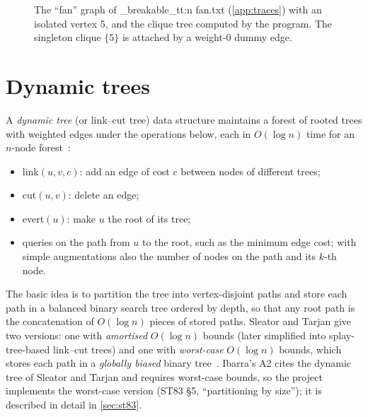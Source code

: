 \documentclass[11pt,a4paper,oneside]{report}
\theoremstyle{plain}
\theoremstyle{definition}
\theoremstyle{remark}
\newcommand{\op}[1]{\textsf{#1}}
\DeclareRobustCommand{\file}[1]{\mtp_breakable_tt:n {#1}}
\begin{document}
\begin{figure}[ht]
\centering
{}
\caption[A clique tree with a dummy edge]{The ``fan'' graph of \file{fan.txt} (\cref{app:traces}) with an isolated vertex 5,
and the clique tree computed by the program. The singleton clique \(\{5\}\) is attached by a
weight-0 dummy edge.}
\label{fig:dummy}
\end{figure}

\section{Dynamic trees}\label{sec:dynamic-trees-background}
A \emph{dynamic tree} (or link--cut tree) data structure maintains a forest of rooted trees
with weighted edges under the operations below, each in \(O(\log n)\) time for an \(n\)-node
forest~\cite{sleator1983}:
\begin{itemize}
\item \op{link}\((u,v,c)\): add an edge of cost \(c\) between nodes of different trees;
\item \op{cut}\((u,v)\): delete an edge;
\item \op{evert}\((u)\): make \(u\) the root of its tree;
\item queries on the path from \(u\) to the root, such as the minimum edge cost; with simple
  augmentations also the number of nodes on the path and its \(k\)-th node.
\end{itemize}
The basic idea is to partition the tree into vertex-disjoint paths and store each path in a
balanced binary search tree ordered by depth, so that any root path is the concatenation of
\(O(\log n)\) pieces of stored paths. Sleator and Tarjan give two versions: one with
\emph{amortised} \(O(\log n)\) bounds (later simplified into splay-tree-based link--cut trees)
and one with \emph{worst-case} \(O(\log n)\) bounds, which stores each path in a
\emph{globally biased} binary tree~\cite{bent1985}. Ibarra's A2 cites the dynamic tree of
Sleator and Tarjan and requires worst-case bounds, so the project implements the worst-case
version (ST83 \S5, ``partitioning by size''); it is described in detail in \cref{sec:st83}.
\end{document}
